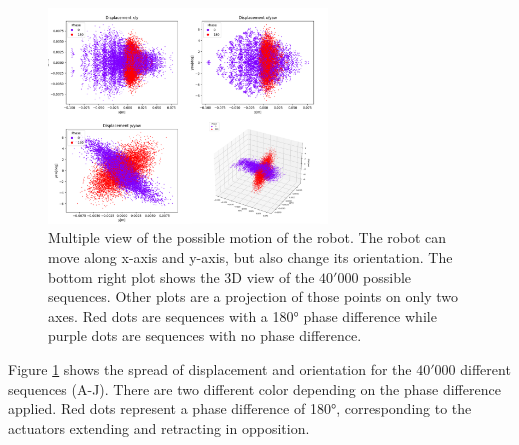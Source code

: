         \begin{figure}[h]
            \centering
            \includegraphics[width=0.66\textwidth]{images/displacement_spread.png}
            \caption{Multiple view of the possible motion of the robot. The robot can move along x-axis and y-axis, but also change its orientation. The bottom right plot shows the 3D view of the $40'000$ possible sequences. Other plots are a projection of those points on only two axes. Red dots are sequences with a 180° phase difference while purple dots are sequences with no phase difference.}
            \label{fig:displacement_spread}
        \end{figure}
        
        Figure \ref{fig:displacement_spread} shows the spread of displacement and orientation for the $40'000$ different sequences (A-J). There are two different color depending on the phase difference applied. Red dots represent a phase difference of 180°, corresponding to the actuators extending and retracting in opposition.
        
